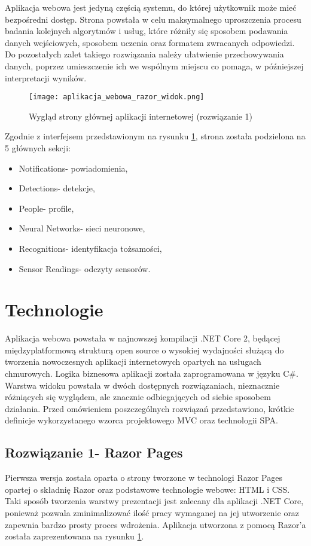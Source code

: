 Aplikacja webowa jest jedyną częścią systemu, do której użytkownik może mieć bezpośredni dostęp. Strona powstała w celu maksymalnego uproszczenia procesu badania kolejnych algorytmów i usług, które różniły się sposobem podawania danych wejściowych, sposobem uczenia oraz formatem zwracanych odpowiedzi. Do pozostałych zalet takiego rozwiązania należy ułatwienie przechowywania danych, poprzez umieszczenie ich we wspólnym miejscu co pomaga, w późniejszej interpretacji wyników.
\begin{figure}[H]
	\centering
	\texttt{[image: aplikacja\_webowa\_razor\_widok.png]}
	\caption{Wygląd strony głównej aplikacji internetowej (rozwiązanie 1)}
	\label{fig:strona_glowna_razor}
\end{figure}
\pagebreak
Zgodnie z interfejsem przedstawionym na rysunku \ref{fig:strona_glowna_razor}, strona została podzielona na 5 głównych sekcji:
\begin{itemize}
\item Notifications- powiadomienia,
\item Detections- detekcje,
\item People- profile,
\item Neural Networks- sieci neuronowe,
\item Recognitions- identyfikacja tożsamości,
\item Sensor Readings- odczyty sensorów.
\end{itemize}

\section{Technologie}\label{s:web_technologie}
Aplikacja webowa powstała w najnowszej kompilacji .NET Core 2, będącej międzyplatformową strukturą open source o wysokiej wydajności służącą do tworzenia nowoczesnych aplikacji internetowych opartych na usługach chmurowych. Logika biznesowa aplikacji została zaprogramowana w języku C\#. Warstwa widoku powstała w dwóch dostępnych rozwiązaniach, nieznacznie różniących się wyglądem, ale znacznie odbiegających od siebie sposobem działania. Przed omówieniem poszczególnych rozwiązań przedstawiono, krótkie definicje wykorzystanego wzorca projektowego MVC oraz technologii SPA. 

\subsection{Rozwiązanie 1- Razor Pages}
Pierwsza wersja została oparta o strony tworzone w technologi Razor Pages opartej o składnię Razor oraz podstawowe technologie webowe: HTML i CSS. Taki sposób tworzenia warstwy prezentacji jest zalecany dla aplikacji .NET Core, ponieważ pozwala zminimalizować ilość pracy wymaganej na jej utworzenie oraz zapewnia bardzo prosty proces wdrożenia. Aplikacja utworzona z pomocą Razor'a została zaprezentowana na rysunku \ref{fig:strona_glowna_razor}.

